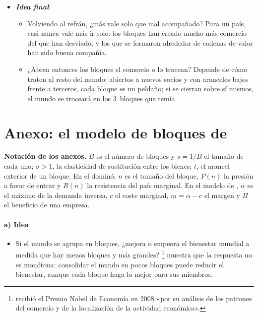 \documentclass[11pt]{article}
\begin{document}
\begin{itemize}
\begin{itemize}
  \item Frente a eso, los bloques abiertos y con reglas profundas, como el CPTPP, son el mejor seguro; los cerrados, como el Mercosur de las últimas décadas, han perdido la apuesta.
  \end{itemize}
\item \textbf{\emph{Idea final}}:
  \begin{itemize}
  \item Volviendo al refrán, ¿más vale solo que mal acompañado? Para un país, casi nunca vale más ir solo: los bloques han creado mucho más comercio del que han desviado, y los que se formaron alrededor de cadenas de valor han sido buena compañía.

  \item ¿Abren entonces los bloques el comercio o lo trocean? Depende de cómo traten al resto del mundo: abiertos a nuevos socios y con aranceles bajos frente a terceros, cada bloque es un peldaño; si se cierran sobre sí mismos, el mundo se troceará en los 3~bloques que  temía.
  \end{itemize}
\end{itemize}

\clearpage
\appendix

\section{Anexo: el modelo de bloques de }\label{anexo:krugman}

\begin{anotaciones}
\textbf{Notación de los anexos.} $B$ es el número de bloques y $s=1/B$ el tamaño de cada uno; $\sigma>1$, la elasticidad de sustitución entre los bienes; $t$, el arancel exterior de un bloque. En el dominó, $n$ es el tamaño del bloque, $P(n)$ la presión a favor de entrar y $R(n)$ la resistencia del país marginal. En el modelo de , $\alpha$ es el máximo de la demanda inversa, $c$ el coste marginal, $m=\alpha-c$ el margen y $\Pi$ el beneficio de una empresa.
\end{anotaciones}

\paragraph{a) Idea}

\begin{itemize}
\item Si el mundo se agrupa en bloques, ¿mejora o empeora el bienestar mundial a medida que hay menos bloques y más grandes? \textcite{Krugman1991Bilateralism}\footnote{ recibió el Premio Nobel de Economía en 2008 «por su análisis de los patrones del comercio y de la localización de la actividad económica»\nocite{Nobel2008Krugman}.} muestra que la respuesta no es monótona: consolidar el mundo en pocos bloques puede reducir el bienestar, aunque cada bloque haga lo mejor para sus miembros.
\end{itemize}
\end{document}
